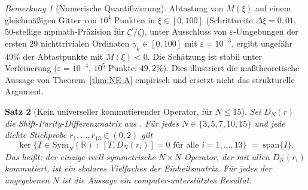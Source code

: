 ﻿\documentclass[12pt,a4paper]{article}
\newtheorem{theorem}{Satz}[section]
\theoremstyle{definition}
\theoremstyle{remark}
\newtheorem{remark}[theorem]{Bemerkung}
\begin{document}
\begin{remark}[Numerische Quantifizierung]
Abtastung von $M(\xi)$ auf einem gleichmäßigen Gitter von $10^4$ Punkten in $\xi \in [0, 100]$ (Schrittweite $\Delta\xi = 0{,}01$, $50$-stellige mpmath-Präzision für $\zeta'/\zeta$), unter Ausschluss von $\varepsilon$-Umgebungen der ersten $29$ nichttrivialen Ordinaten $\gamma_k \in [0,100]$ mit $\varepsilon = 10^{-3}$, ergibt ungefähr $49\%$ der Abtastpunkte mit $M(\xi) < 0$. Die Schätzung ist stabil unter Verfeinerung ($\varepsilon = 10^{-4}$, $10^5$ Punkte: $49{,}2\%$). Dies illustriert die maßtheoretische Aussage von Theorem~\ref{thm:NE-A} empirisch und ersetzt nicht das strukturelle Argument.
\end{remark}

\begin{theorem}[Kein universeller kommutierender Operator, für $N \leq 15$]\label{thm:NE-B}
Sei $D_N(r)$ die Shift-Parity-Differenzmatrix aus . Für jedes $N \in \{3, 5, 7, 10, 15\}$ und jede dichte Stichprobe $r_1, \ldots, r_{13} \in (0,2)$ gilt
\[
  \ker\bigl\{T \in \mathrm{Sym}_N(\mathbb{R}) \;:\; [T, D_N(r_i)] = 0 \text{ für alle } i = 1, \ldots, 13\bigr\} \;=\; \mathrm{span}\{I\}.
\]
Das heißt: der einzige reell-symmetrische $N \times N$-Operator, der mit allen $D_N(r_i)$ kommutiert, ist ein skalares Vielfaches der Einheitsmatrix. Für jedes der angegebenen $N$ ist die Aussage ein computer-unterstütztes Resultat.
\end{theorem}
\end{document}

